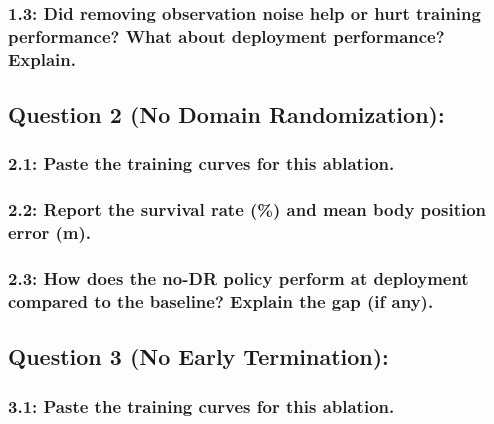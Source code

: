 \documentclass[12pt]{article}
\begin{document}
\subsubsection*{1.3: Did removing observation noise help or hurt training performance? What about deployment performance? Explain.}
\begin{solution}[height=7cm]
\end{solution}

\newpage

\subsection*{Question 2 (No Domain Randomization):}

\subsubsection*{2.1: Paste the training curves for this ablation.}
\begin{solution}[height=10cm]
\end{solution}

\subsubsection*{2.2: Report the survival rate (\%) and mean body position error (m).}
\begin{solution}[height=4cm]
\end{solution}

\subsubsection*{2.3: How does the no-DR policy perform at deployment compared to the baseline? Explain the gap (if any).}
\begin{solution}[height=7cm]
\end{solution}

\newpage

\subsection*{Question 3 (No Early Termination):}

\subsubsection*{3.1: Paste the training curves for this ablation.}
\begin{solution}[height=10cm]
\end{solution}
\end{document}
